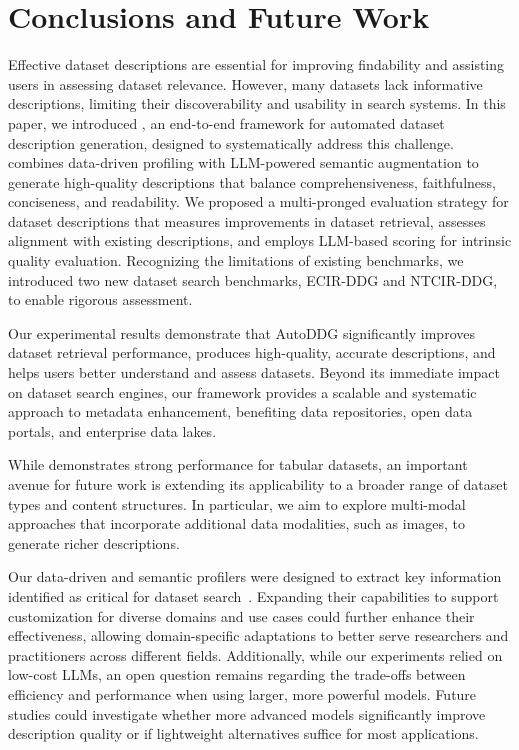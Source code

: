 \vspace{-.3cm}
\section{Conclusions and Future Work}
\label{sec:conclusion}


Effective dataset descriptions are essential for improving findability and assisting users in assessing dataset relevance. However, many datasets lack informative descriptions, limiting their discoverability and usability in search systems. In this paper, we introduced \SystemName, an end-to-end framework for automated dataset description generation, designed to systematically address this challenge.
%
\SystemName combines data-driven profiling with LLM-powered semantic augmentation to generate high-quality descriptions that balance comprehensiveness, faithfulness, conciseness, and readability. 
%
We proposed a multi-pronged evaluation strategy for dataset descriptions that measures improvements in dataset retrieval, assesses alignment with existing descriptions, and employs LLM-based scoring for intrinsic quality evaluation. Recognizing the limitations of existing benchmarks, we introduced two new dataset search benchmarks, ECIR-DDG and NTCIR-DDG, to enable rigorous assessment.

Our experimental results demonstrate that AutoDDG significantly improves dataset retrieval performance, produces high-quality, accurate descriptions, and helps users better understand and assess datasets. Beyond its immediate impact on dataset search engines, our framework provides a scalable and systematic approach to metadata enhancement, benefiting data repositories, open data portals, and enterprise data lakes.



While \SystemName demonstrates strong performance for tabular datasets, an important avenue for future work is extending its applicability to a broader range of dataset types and content structures. In particular, we aim to explore multi-modal approaches that incorporate additional data modalities, such as images, to generate richer descriptions.

Our data-driven and semantic profilers were designed to extract key information identified as critical for dataset search~\cite{koesten2017trials,papenmeier2021genuine,Sostek2024Discovering}.  Expanding their capabilities to support customization for diverse domains and use cases could further enhance their effectiveness, allowing domain-specific adaptations to better serve researchers and practitioners across different fields.
%
Additionally, while our experiments relied on low-cost LLMs, an open question remains regarding the trade-offs between efficiency and performance when using larger, more powerful models. Future studies could investigate whether more advanced models significantly improve description quality or if lightweight alternatives suffice for most applications.

